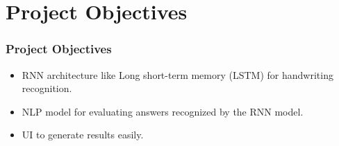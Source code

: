 \section{Project Objectives} 

\begin{frame}
\frametitle{Project Objectives}
\begin{itemize}
    \item RNN architecture like Long short-term memory (LSTM)
    for handwriting recognition.
    \item NLP model for evaluating answers recognized
    by the RNN model.
    \item UI to generate results easily.
\end{itemize}
\end{frame}